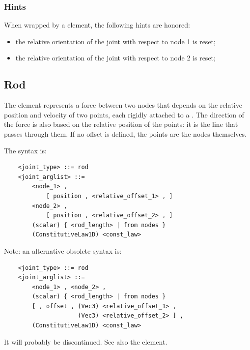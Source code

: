 \subsubsection{Hints}
When wrapped by a  element, the following hints are honored:
\begin{itemize}
\item {} the relative orientation of the joint
with respect to node 1 is reset;
\item {} the relative orientation of the joint
with respect to node 2 is reset;
\end{itemize}





\subsection{Rod}\label{sec:EL:STRUCT:JOINT:ROD}
The  element represents a force between two nodes that depends
on the relative position and velocity of two points, each rigidly attached
to a .
The direction of the force is also based on the relative position
of the points: it is the line that passes through them.
If no offset is defined, the points are the nodes themselves.

The syntax is:
\begin{verbatim}
    <joint_type> ::= rod 
    <joint_arglist> ::=
        <node_1> ,
            [ position , <relative_offset_1> , ]
        <node_2> , 
            [ position , <relative_offset_2> , ]
        (scalar) { <rod_length> | from nodes }
        (ConstitutiveLaw1D) <const_law>
\end{verbatim}
Note: an alternative obsolete syntax is:
\begin{verbatim}
    <joint_type> ::= rod 
    <joint_arglist> ::=
        <node_1> , <node_2> , 
        (scalar) { <rod_length> | from nodes }
        [ , offset , (Vec3) <relative_offset_1> , 
                     (Vec3) <relative_offset_2> ] ,
        (ConstitutiveLaw1D) <const_law>
\end{verbatim}
It will probably be discontinued.
See also
the 
element.

